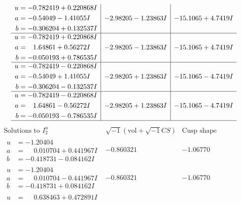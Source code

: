 \documentclass[1p]{elsarticle_modified}
\theoremstyle{definition}
\newcommand{\I}{\sqrt{-1}}
\begin{document}
$$\begin{array}{c|c|c}
\begin{aligned}
u &= -0.782419 + 0.220868 I \\
a &= -0.54049 - 1.41055 I \\
b &= -0.306204 + 0.132537 I\end{aligned}
 & -2.98205 - 1.23863 I & -15.1065 + 4.7419 I \\ \hline\begin{aligned}
u &= -0.782419 + 0.220868 I \\
a &= \phantom{-}1.64861 + 0.56272 I \\
b &= -0.050193 + 0.786535 I\end{aligned}
 & -2.98205 - 1.23863 I & -15.1065 + 4.7419 I \\ \hline\begin{aligned}
u &= -0.782419 - 0.220868 I \\
a &= -0.54049 + 1.41055 I \\
b &= -0.306204 - 0.132537 I\end{aligned}
 & -2.98205 + 1.23863 I & -15.1065 - 4.7419 I \\ \hline\begin{aligned}
u &= -0.782419 - 0.220868 I \\
a &= \phantom{-}1.64861 - 0.56272 I \\
b &= -0.050193 - 0.786535 I\end{aligned}
 & -2.98205 + 1.23863 I & -15.1065 - 4.7419 I\\
 \hline 
 \end{array}$$\newpage$$\begin{array}{c|c|c}  
\text{Solutions to }I^u_{2}& \I (\text{vol} + \sqrt{-1}CS) & \text{Cusp shape}\\
 \hline 
\begin{aligned}
u &= -1.20404\phantom{ +0.000000I} \\
a &= \phantom{-}0.010704 + 0.441967 I \\
b &= -0.418731 - 0.084162 I\end{aligned}
 & -0.860321\phantom{ +0.000000I} & -1.06770\phantom{ +0.000000I} \\ \hline\begin{aligned}
u &= -1.20404\phantom{ +0.000000I} \\
a &= \phantom{-}0.010704 - 0.441967 I \\
b &= -0.418731 + 0.084162 I\end{aligned}
 & -0.860321\phantom{ +0.000000I} & -1.06770\phantom{ +0.000000I} \\ \hline\begin{aligned}
u &= \phantom{-}0.638463 + 0.472891 I \\

\end{aligned}
\end{array}$$
\end{document}
